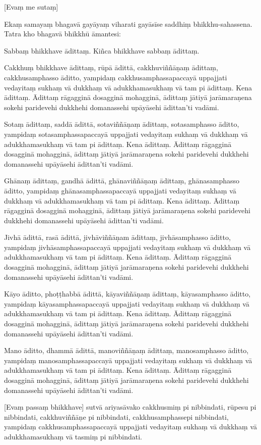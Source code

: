 \clearpage

[Evaṃ me sutaṃ]

Ekaṃ samayaṃ bhagavā gayāyaṃ viharati gayāsīse saddhiṃ bhikkhu-sahassena.
Tatra kho bhagavā bhikkhū āmantesi:

Sabbaṃ bhikkhave ādittaṃ. Kiñca bhikkhave sabbaṃ ādittaṃ.

Cakkhuṃ bhikkhave ādittaṃ, rūpā ādittā, cakkhuviññāṇaṃ ādittaṃ,
cakkhusamphasso āditto, yampidaṃ cakkhusamphassapaccayā uppajjati
vedayitaṃ sukhaṃ vā dukkhaṃ vā adukkhamasukhaṃ vā tam pi ādittaṃ. Kena
ādittaṃ. Ādittaṃ rāgagginā dosagginā mohagginā, ādittaṃ jātiyā
jarāmaraṇena sokehi paridevehi dukkhehi domanassehi upāyāsehi ādittan'ti
vadāmi.

Sotaṃ ādittaṃ, saddā ādittā, sotaviññāṇaṃ ādittaṃ, sotasamphasso āditto,
yampidaṃ sotasamphassapaccayā uppajjati vedayitaṃ sukhaṃ vā dukkhaṃ vā
adukkhamasukhaṃ vā tam pi ādittaṃ. Kena ādittaṃ. Ādittaṃ rāgagginā
dosagginā mohagginā, ādittaṃ jātiyā jarāmaraṇena sokehi paridevehi
dukkhehi domanassehi upāyāsehi ādittan'ti vadāmi.

Ghānaṃ ādittaṃ, gandhā ādittā, ghānaviññāṇaṃ ādittaṃ, ghānasamphasso
āditto, yampidaṃ ghānasamphassapaccayā uppajjati vedayitaṃ sukhaṃ vā
dukkhaṃ vā adukkhamasukhaṃ vā tam pi ādittaṃ. Kena ādittaṃ. Ādittaṃ
rāgagginā dosagginā mohagginā, ādittaṃ jātiyā jarāmaraṇena sokehi
paridevehi dukkhehi domanassehi upāyāsehi ādittan'ti vadāmi.

Jivhā ādittā, rasā ādittā, jivhāviññāṇam ādittaṃ, jivhāsamphasso āditto,
yampidaṃ jivhāsamphassapaccayā uppajjati vedayitaṃ sukhaṃ vā dukkhaṃ vā
adukkhamasukhaṃ vā tam pi ādittaṃ. Kena ādittaṃ. Ādittaṃ rāgagginā
dosagginā mohagginā, ādittaṃ jātiyā jarāmaraṇena sokehi paridevehi
dukkhehi domanassehi upāyāsehi ādittan'ti vadāmi.

Kāyo āditto, phoṭṭhabbā ādittā, kāyaviññāṇaṃ ādittaṃ, kāyasamphasso
āditto, yampidaṃ kāyasamphassapaccayā uppajjati vedayitaṃ sukhaṃ vā
dukkhaṃ vā adukkhamasukhaṃ vā tam pi ādittaṃ. Kena ādittaṃ. Ādittaṃ
rāgagginā dosagginā mohagginā, ādittaṃ jātiyā jarāmaraṇena sokehi
paridevehi dukkhehi domanassehi upāyāsehi ādittan'ti vadāmi.

Mano āditto, dhammā ādittā, manoviññāṇaṃ ādittaṃ, manosamphasso āditto,
yampidaṃ manosamphassapaccayā uppajjati vedayitaṃ sukhaṃ vā dukkhaṃ vā
adukkhamasukhaṃ vā tam pi ādittaṃ. Kena ādittaṃ. Ādittaṃ rāgagginā
dosagginā mohagginā, ādittaṃ jātiyā jarāmaraṇena sokehi paridevehi
dukkhehi domanassehi upāyāsehi ādittan'ti vadāmi.

[Evaṃ passaṃ bhikkhave] sutvā ariyasāvako cakkhusmiṃ pi nibbindati,
rūpesu pi nibbindati, cakkhuviññāṇe pi nibbindati, cakkhusamphassepi
nibbindati, yampidaṃ cakkhusamphassapaccayā uppajjati vedayitaṃ sukhaṃ
vā dukkhaṃ vā adukkhamasukhaṃ vā tasmiṃ pi nibbindati.

